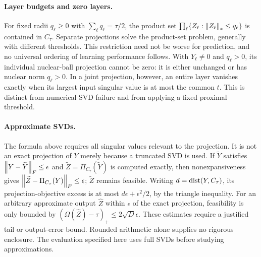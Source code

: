 \paragraph{Layer budgets and zero layers.}
For fixed radii $q_\ell\ge0$ with $\sum_\ell q_\ell=\tau/2$, the product set $\prod_\ell\{Z_\ell:\left\lVert Z_\ell\right\rVert_*\le q_\ell\}$ is contained in $C_\tau$. Separate projections solve the product-set problem, generally with different thresholds. This restriction need not be worse for prediction, and no universal ordering of learning performance follows. With $Y_\ell\ne0$ and $q_\ell>0$, its individual nuclear-ball projection cannot be zero: it is either unchanged or has nuclear norm $q_\ell>0$. In a joint projection, however, an entire layer vanishes exactly when its largest input singular value is at most the common $t$. This is distinct from numerical SVD failure and from applying a fixed proximal threshold.

\paragraph{Approximate SVDs.}
The formula above requires all singular values relevant to the projection. It is not an exact projection of $Y$ merely because a truncated SVD is used. If $\widetilde Y$ satisfies $\left\lVert Y-\widetilde Y\right\rVert_F\le\epsilon$ and $\widetilde Z=\Pi_{C_\tau}(\widetilde Y)$ is computed exactly, then nonexpansiveness gives
$\left\lVert\widetilde Z-\Pi_{C_\tau}(Y)\right\rVert_F\le\epsilon$; $\widetilde Z$ remains feasible. Writing $d=\operatorname{dist}(Y,C_\tau)$, its projection-objective excess is at most $d\epsilon+\epsilon^2/2$, by the triangle inequality. For an arbitrary approximate output $\widehat Z$ within $\epsilon$ of the exact projection, feasibility is only bounded by $(\Omega(\widehat Z)-\tau)_+\le2\sqrt D\epsilon$. These estimates require a justified tail or output-error bound. Rounded arithmetic alone supplies no rigorous enclosure. The evaluation specified here uses full SVDs before studying approximations.

